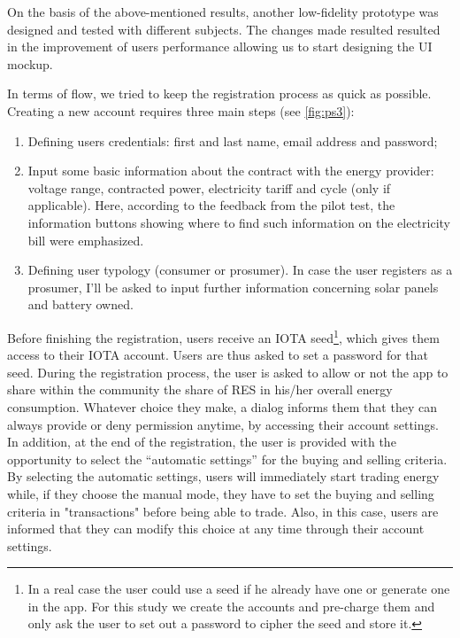 On the basis of the above-mentioned results, another low-fidelity prototype was designed and tested with different subjects. The changes made resulted resulted in the improvement of users performance allowing us to start designing the \ac{UI} mockup.

In terms of flow, we tried to keep the registration process as quick as possible. Creating a new account requires three main steps (see \cref{fig:ps3}):
\begin{enumerate}
    \item Defining users credentials: first and last name, email address and password;
    \item Input some basic information about the contract with the energy provider: voltage range, contracted power, electricity tariff and cycle (only if applicable). Here, according to the feedback from the pilot test, the information buttons showing where to find such information on the electricity bill were emphasized.
    \item Defining user typology (consumer or prosumer). In case the user registers as a prosumer, I’ll be asked to input further information concerning solar panels and battery owned.
\end{enumerate}


Before finishing the registration, users receive an IOTA seed\footnote{In a real case the user could use a seed if he already have one or generate one in the app. For this study we create the accounts and pre-charge them and only ask the user to set out a password to cipher the seed and store it.}, which gives them access to their IOTA account. Users are thus asked to set a password for that seed.
During the registration process, the user is asked to allow or not the app to share within the community the share of RES in his/her overall energy consumption. Whatever choice they make, a dialog informs them that they can always provide or deny permission anytime, by accessing their account settings. In addition, at the end of the registration, the user is provided with the opportunity to select the “automatic settings” for the buying and selling criteria. By selecting the automatic settings, users will immediately start trading energy while, if they choose the manual mode, they have to set the buying and selling criteria in "transactions" before being able to trade. Also, in this case, users are informed that they can modify this choice at any time through their account settings.

